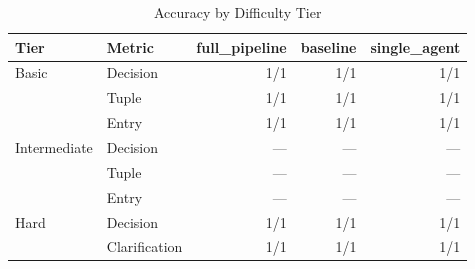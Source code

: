 \begin{table}[htbp]
\centering
\caption{Accuracy by Difficulty Tier}
\label{tab:tier-breakdown}
\begin{tabular}{ll rrr}
\toprule
Tier & Metric & full\_pipeline & baseline & single\_agent \\
\midrule
  Basic & Decision & 1/1 & 1/1 & 1/1 \\
   & Tuple & 1/1 & 1/1 & 1/1 \\
   & Entry & 1/1 & 1/1 & 1/1 \\
  \midrule
  Intermediate & Decision & --- & --- & --- \\
   & Tuple & --- & --- & --- \\
   & Entry & --- & --- & --- \\
  \midrule
  Hard & Decision & 1/1 & 1/1 & 1/1 \\
   & Clarification & 1/1 & 1/1 & 1/1 \\
\bottomrule
\end{tabular}
\end{table}
